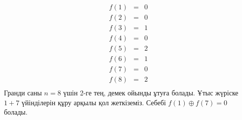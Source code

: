 \[
\begin{array}{lcl}
f(1) & = & 0 \\
f(2) & = & 0 \\
f(3) & = & 1 \\
f(4) & = & 0 \\
f(5) & = & 2 \\
f(6) & = & 1 \\
f(7) & = & 0 \\
f(8) & = & 2 \\
\end{array}
\]
Гранди саны $n=8$ үшін 2-ге тең, демек ойынды ұтуға болады. 
Ұтыс жүріске $1+7$ үйінділерін құру арқылы қол жеткіземіз.
Себебі $f(1) \oplus f(7) = 0$ болады.

